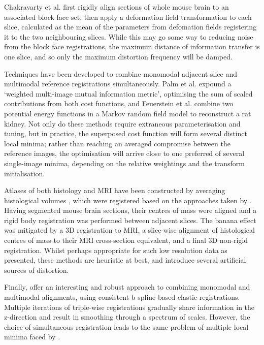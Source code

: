   Chakravarty et al. \cite{Chakravarty2008} first rigidly align sections of whole mouse brain to an associated block face set, then apply a deformation field transformation to each slice, calculated as the mean of the parameters from defomation fields registering it to the two neighbouring slices. While this may go some way to reducing noise from the block face registrations, the maximum distance of information transfer is one slice, and so only the maximum distortion frequency will be damped.
  
  Techniques have been developed to combine monomodal adjacent slice and multimodal reference registrations simultaneously. Palm et al. \cite{Palm2008} expound a `weighted multi-image mutual information metric', optimising the sum of scaled contributions from both cost functions, and Feuerstein et al. \cite{Feuerstein2011} combine two potential energy functions in a Markov random field model to reconstruct a rat kidney. Not only do these methods require extraneous parameterisation and tuning, but in practice, the superposed cost function will form several distinct local minima; rather than reaching an averaged compromise between the reference images, the optimisation will arrive close to one preferred of several single-image minima, depending on the relative weightings and the transform initialisation.
  
  Atlases of both histology and MRI have been constructed by averaging histological volumes \cite{Li2009}, which were registered based on the approaches taken by \cite{Malandain2004,Yushkevich2006}. Having segmented mouse brain sections, their centres of mass were aligned and a rigid body registration was performed between adjacent slices. The banana effect was mitigated by a 3D registration to MRI, a slice-wise alignment of histological centres of mass to their MRI cross-section equivalent, and a final 3D non-rigid registration. Whilst perhaps appropriate for such low resolution data as presented, these methods are heuristic at best, and introduce several artificial sources of distortion.
  
  Finally, \cite{Arganda-Carreras2010} offer an interesting and robust approach to combining monomodal and multimodal alignments, using consistent b-spline-based elastic registrations. Multiple iterations of triple-wise registrations gradually share information in the z-direction and result in smoothing through a spectrum of scales. However, the choice of simultaneous registration leads to the same problem of multiple local minima faced by \cite{Palm2008,Feuerstein2011}.

